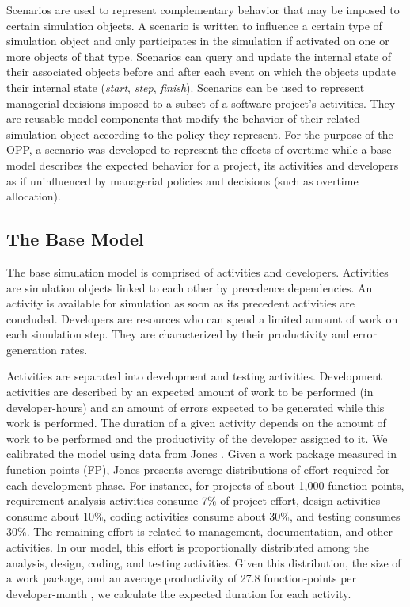 \documentclass[conference]{IEEEtran}
\begin{document}
Scenarios are used to represent complementary behavior that may be imposed to certain simulation objects. A scenario is written to influence a certain type of simulation object and only participates in the simulation if activated on one or more objects of that type. Scenarios can query and update the internal state of their associated objects before and after each event on which the objects update their internal state ({\it start}, {\it step}, {\it finish}). Scenarios can be used to represent managerial decisions imposed to a subset of a software project's activities. They are reusable model components that modify the behavior of their related simulation object according to the policy they represent. For the purpose of the OPP, a scenario was developed to represent the effects of overtime while a base model describes the expected behavior for a project, its activities and developers as if uninfluenced by managerial policies and decisions (such as overtime allocation).

\subsection{The Base Model}
The base simulation model is comprised of activities and developers. Activities are simulation objects linked to each other by precedence dependencies. An activity is available for simulation as soon as its precedent activities are concluded. Developers are resources who can spend a limited amount of work on each simulation step. They are characterized by their productivity and error generation rates.

Activities are separated into development and testing activities. Development activities are described by an expected amount of work to be performed (in developer-hours) and an amount of errors expected to be generated while this work is performed. The duration of a given activity depends on the amount of work to be performed and the productivity of the developer assigned to it. We calibrated the model using data from Jones \cite{Jones:2000}. Given a work package measured in function-points (FP), Jones \cite{Jones:2000} presents average distributions of effort required for each development phase. For instance, for projects of about 1,000 function-points, requirement analysis activities consume 7\% of project effort, design activities consume about 10\%, coding activities consume about 30\%, and testing consumes 30\%. The remaining effort is related to management, documentation, and other activities. In our model, this effort is proportionally distributed among the analysis, design, coding, and testing activities. Given this distribution, the size of a work package, and an average productivity of 27.8 function-points per developer-month \cite{Jones:2000}, we calculate the expected duration for each activity.
\end{document}
